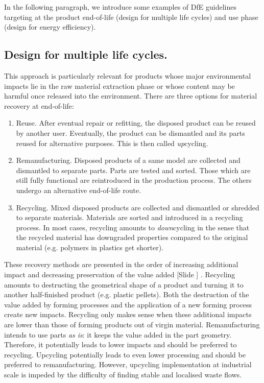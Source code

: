 \documentclass{article}
\newcounter{slide}
\begin{document}
In the following paragraph, we introduce some examples of DfE guidelines targeting at the product end-of-life (design for multiple life cycles) and use phase (design for energy efficiency).

\subsection{Design for multiple life cycles.}
\label{sec:DfR}
This approach is particularly relevant for products whose major environmental impacts lie in the raw material extraction phase or whose content may be harmful once released into the environment. There are three options for material recovery at end-of-life:
\begin{enumerate}
	\item Reuse. After eventual repair or refitting, the disposed product can be reused by another user. Eventually, the product can be dismantled and its parts reused for alternative purposes. This is then called \emph{up}cycling. 
	\item Remanufacturing. Disposed products of a same model are collected and dismantled to separate parts. Parts are tested and sorted. Those which are still fully functional are reintroduced in the production process. The others undergo an alternative end-of-life route.
	\item Recycling. Mixed disposed products are collected and dismantled or shredded to separate materials. Materials are sorted and introduced in a recycling process. In most cases, recycling amounts to \emph{down}cycling in the sense that the recycled material has downgraded properties compared to the original material (e.g. polymers in plastics get shorter).
\end{enumerate}
These recovery methods are presented in the order of increasing additional impact and decreasing preservation of the value added {\color{blue}[Slide ]} \cite{mihelcicSustainabilityScienceEngineering2003}. Recycling amounts to destructing the geometrical shape of a product and turning it to another half-finished product (e.g. plastic pellets). Both the destruction of the value added by forming processes and the application of a new forming process create new impacts. Recycling only makes sense when these additional impacts are lower than those of forming products out of virgin material. Remanufacturing intends to use parts \emph{as is}: it keeps the value added in the part geometry. Therefore, it potentially leads to lower impacts and should be preferred to recycling. Upcycling potentially leads to even lower processing and should be preferred to remanufacturing. However, upcycling implementation at industrial scale is impeded by the difficulty of finding stable and localised waste flows.
\end{document}
